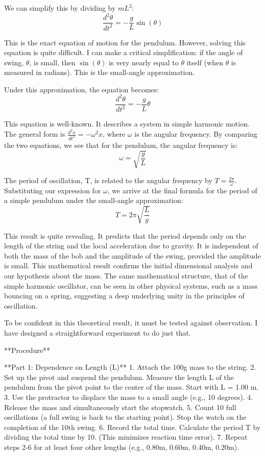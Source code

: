 \documentclass[12pt]{article}
\begin{document}
We can simplify this by dividing by \(mL^2\):
\[\frac{d^2\theta}{dt^2} = -\frac{g}{L} \sin(\theta)\]

This is the exact equation of motion for the pendulum. However, solving this equation is quite difficult. I can make a critical simplification: if the angle of swing, \(\theta\), is small, then \(\sin(\theta)\) is very nearly equal to \(\theta\) itself (when \(\theta\) is measured in radians). This is the small-angle approximation.

Under this approximation, the equation becomes:
\[\frac{d^2\theta}{dt^2} = -\frac{g}{L} \theta\]

This equation is well-known. It describes a system in simple harmonic motion. The general form is \(\frac{d^2x}{dt^2} = -\omega^2 x\), where \(\omega\) is the angular frequency. By comparing the two equations, we see that for the pendulum, the angular frequency is:
\[\omega = \sqrt{\frac{g}{L}}\]

The period of oscillation, T, is related to the angular frequency by \(T = \frac{2\pi}{\omega}\). Substituting our expression for \(\omega\), we arrive at the final formula for the period of a simple pendulum under the small-angle approximation:
\[T = 2\pi \sqrt{\frac{L}{g}}\]

This result is quite revealing. It predicts that the period depends only on the length of the string and the local acceleration due to gravity. It is independent of both the mass of the bob and the amplitude of the swing, provided the amplitude is small. This mathematical result confirms the initial dimensional analysis and our hypothesis about the mass. The same mathematical structure, that of the simple harmonic oscillator, can be seen in other physical systems, such as a mass bouncing on a spring, suggesting a deep underlying unity in the principles of oscillation.
\par
\bigskip
To be confident in this theoretical result, it must be tested against observation. I have designed a straightforward experiment to do just that.

**Procedure**

**Part 1: Dependence on Length (L)**
1.  Attach the 100g mass to the string.
2.  Set up the pivot and suspend the pendulum. Measure the length L of the pendulum from the pivot point to the center of the mass. Start with L = 1.00 m.
3.  Use the protractor to displace the mass to a small angle (e.g., 10 degrees).
4.  Release the mass and simultaneously start the stopwatch.
5.  Count 10 full oscillations (a full swing is back to the starting point). Stop the watch on the completion of the 10th swing.
6.  Record the total time. Calculate the period T by dividing the total time by 10. (This minimizes reaction time error).
7.  Repeat steps 2-6 for at least four other lengths (e.g., 0.80m, 0.60m, 0.40m, 0.20m).
\end{document}
